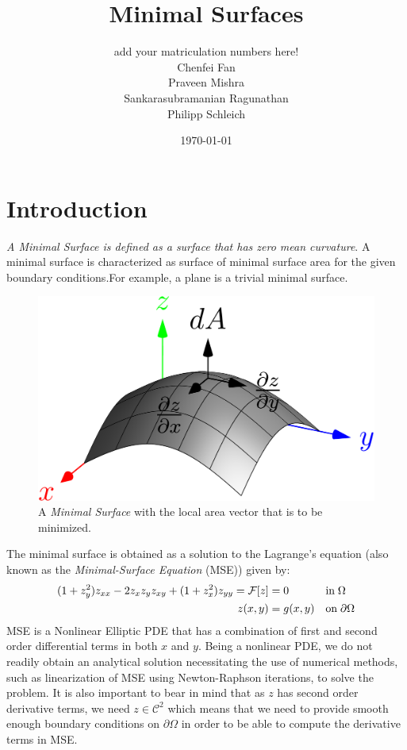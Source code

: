 \documentclass[11pt]{scrartcl}
\title{Minimal Surfaces}
\author{add your matriculation numbers here!\\Chenfei Fan \\  Praveen Mishra\quad 389850 \\ Sankarasubramanian Ragunathan\quad 389851\\ Philipp Schleich\quad 391779}
\date{\today \\ \vspace{0.9cm}}
\begin{document}
\maketitle

%
\clearpage
\protect \tableofcontents



\newpage
	
\onehalfspacing
\section{Introduction}
\textit{A Minimal Surface is defined as a surface that has zero mean curvature}. A minimal surface is characterized as surface of minimal surface area for the given boundary conditions.For example, a plane is a trivial minimal surface.
\begin{figure}[H]
	\centering
	\includegraphics[width=0.5\linewidth]{./figs/minsurfIntro.png}
	\caption{A \textit{Minimal Surface} with the local area vector that is to be minimized.}
\end{figure}
The minimal surface is obtained as a solution to the Lagrange's equation (also known as the \textit{Minimal-Surface Equation} (MSE)) given by:
\begin{align}
	(1 + z_{y}^{2})z_{xx} - 2z_{x}z_{y}z_{xy} + (1+z_{x}^{2})z_{yy} = \mathcal{F}[z] &= 0 && \text{in} \; \Omega \\
	\notag
	z(x,y) &= g(x,y) && \text{on} \; \partial \Omega
\end{align}
MSE is a Nonlinear Elliptic PDE that has a combination of first and second order differential terms in both $x$ and $y$. Being a nonlinear PDE, we do not readily obtain an analytical solution necessitating the use of numerical methods, such as linearization of MSE using Newton-Raphson iterations, to solve the problem. It is also important to bear in mind that as $z$ has second order derivative terms, we need $z \in \mathcal{C}^{2}$ which means that we need to provide smooth enough boundary conditions on $\partial \Omega$ in order to be able to compute the derivative terms in MSE.
\end{document}
